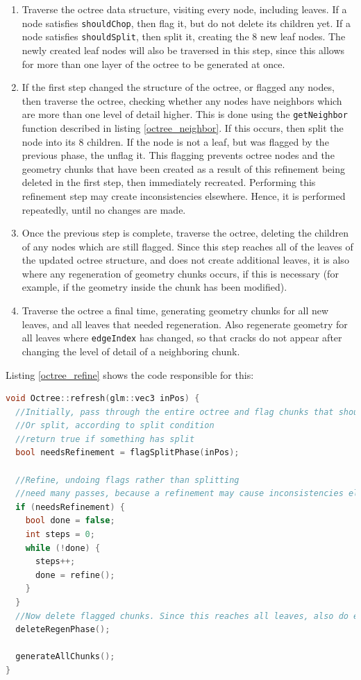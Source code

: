 \documentclass{article}
\begin{document}
\begin{enumerate}
  \item Traverse the octree data structure, visiting every node, including leaves. If a node satisfies \texttt{shouldChop}, then flag it, but do not delete its children yet. If a node satisfies \texttt{shouldSplit}, then split it, creating the 8 new leaf nodes. The newly created leaf nodes will also be traversed in this step, since this allows for more than one layer of the octree to be generated at once.
  \item If the first step changed the structure of the octree, or flagged any nodes, then traverse the octree, checking whether any nodes have neighbors which are more than one level of detail higher. This is done using the \texttt{getNeighbor} function described in listing \ref{octree_neighbor}. If this occurs, then split the node into its 8 children. If the node is not a leaf, but was flagged by the previous phase, the unflag it. This flagging prevents octree nodes and the geometry chunks that have been created as a result of this refinement being deleted in the first step, then immediately recreated. Performing this refinement step may create inconsistencies elsewhere. Hence, it is performed repeatedly, until no changes are made.
  \item Once the previous step is complete, traverse the octree, deleting the children of any nodes which are still flagged. Since this step reaches all of the leaves of the updated octree structure, and does not create additional leaves, it is also where any regeneration of geometry chunks occurs, if this is necessary (for example, if the geometry inside the chunk has been modified).
  \item Traverse the octree a final time, generating geometry chunks for all new leaves, and all leaves that needed regeneration. Also regenerate geometry for all leaves where \texttt{edgeIndex} has changed, so that cracks do not appear after changing the level of detail of a neighboring chunk.
\end{enumerate}
Listing \ref{octree_refine} shows the code responsible for this:
\begin{lstlisting}[language=C++,label={octree_refine},caption={Code showing the order of steps in the octree refinement process}]
void Octree::refresh(glm::vec3 inPos) {
  //Initially, pass through the entire octree and flag chunks that should be deleted, according to the chop condition
  //Or split, according to split condition
  //return true if something has split
  bool needsRefinement = flagSplitPhase(inPos);

  //Refine, undoing flags rather than splitting
  //need many passes, because a refinement may cause inconsistencies elsewhere
  if (needsRefinement) {
    bool done = false;
    int steps = 0;
    while (!done) {
      steps++;
      done = refine();
    }
  }
  //Now delete flagged chunks. Since this reaches all leaves, also do editing regeneration here
  deleteRegenPhase();

  generateAllChunks();
}
\end{lstlisting}
\end{document}
